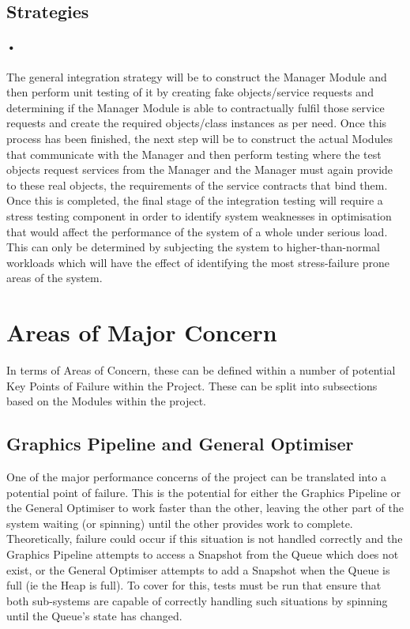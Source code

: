 \documentclass[11pt]{article}
\begin{document}
\subsection{Strategies}
\paragraph{•}
The general integration strategy will be to construct the Manager Module and then perform unit testing of it by creating fake objects/service requests and determining if the Manager Module is able to contractually fulfil those service requests and create the required objects/class instances as per need. Once this process has been finished, the next step will be to construct the actual Modules that communicate with the Manager and then perform testing where the test objects request services from the Manager and the Manager must again provide to these real objects, the requirements of the service contracts that bind them. Once this is completed, the final stage of the integration testing will require a stress testing component in order to identify system weaknesses in optimisation that would affect the performance of the system of a whole under serious load. This can only be determined by subjecting the system to higher-than-normal workloads which will have the effect of identifying the most stress-failure prone areas of the system.

\section{Areas of Major Concern}
In terms of Areas of Concern, these can be defined within a number of potential Key Points of Failure within the Project. These can be split into subsections based on the Modules within the project.
\subsection{Graphics Pipeline and General Optimiser}
One of the major performance concerns of the project can be translated into a potential point of failure. This is the potential for either the Graphics Pipeline or the General Optimiser to work faster than the other, leaving the other part of the system waiting (or spinning) until the other provides work to complete. Theoretically, failure could occur if this situation is not handled correctly and the Graphics Pipeline attempts to access a Snapshot from the Queue which does not exist, or the General Optimiser attempts to add a Snapshot when the Queue is full (ie the Heap is full). 
\newline To cover for this, tests must be run that ensure that both sub-systems are capable of correctly handling such situations by spinning until the Queue's state has changed.
\end{document}
